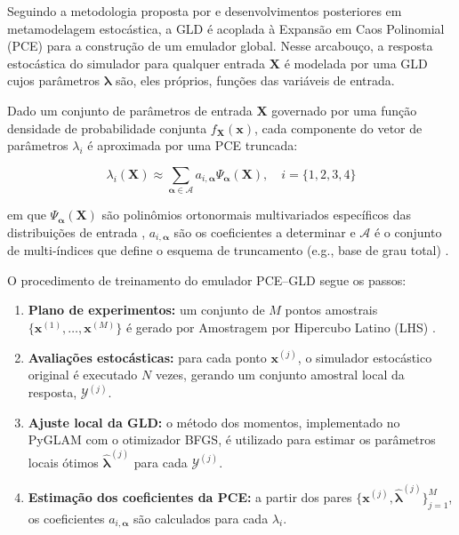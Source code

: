 Seguindo a metodologia proposta por \citet{ZhuSudret2021} e desenvolvimentos posteriores em metamodelagem estocástica, a GLD é acoplada à Expansão em Caos Polinomial (PCE) para a construção de um emulador global. Nesse arcabouço, a resposta estocástica do simulador para qualquer entrada $\mathbf{X}$ é modelada por uma GLD cujos parâmetros $\boldsymbol{\lambda}$ são, eles próprios, funções das variáveis de entrada.

Dado um conjunto de parâmetros de entrada $\mathbf{X}$ governado por uma função densidade de probabilidade conjunta $f_{\mathbf{X}}(\mathbf{x})$, cada componente do vetor de parâmetros $\lambda_i$ é aproximada por uma PCE truncada:

\begin{equation}
\lambda_i(\mathbf{X}) \approx \sum_{\boldsymbol{\alpha} \in \mathcal{A}} a_{i, \boldsymbol{\alpha}} \Psi_{\boldsymbol{\alpha}}(\mathbf{X}), \quad i = \{1, 2, 3, 4\}
\label{eq:pce_lambda}
\end{equation}

\noindent em que $\Psi_{\boldsymbol{\alpha}}(\mathbf{X})$ são polinômios ortonormais multivariados específicos das distribuições de entrada \citep{xiu2002}, $a_{i, \boldsymbol{\alpha}}$ são os coeficientes a determinar e $\mathcal{A}$ é o conjunto de multi-índices que define o esquema de truncamento (e.g., base de grau total) \citep{blatman2011}.

O procedimento de treinamento do emulador PCE--GLD segue os passos:

\begin{enumerate}
    \item \textbf{Plano de experimentos:} um conjunto de $M$ pontos amostrais $\{\mathbf{x}^{(1)}, \dots, \mathbf{x}^{(M)}\}$ é gerado por Amostragem por Hipercubo Latino (LHS) \citep{mckay1979}.
    \item \textbf{Avaliações estocásticas:} para cada ponto $\mathbf{x}^{(j)}$, o simulador estocástico original é executado $N$ vezes, gerando um conjunto amostral local da resposta, $\mathcal{Y}^{(j)}$.
    \item \textbf{Ajuste local da GLD:} o método dos momentos, implementado no PyGLAM com o otimizador BFGS, é utilizado para estimar os parâmetros locais ótimos $\hat{\boldsymbol{\lambda}}^{(j)}$ para cada $\mathcal{Y}^{(j)}$.
    \item \textbf{Estimação dos coeficientes da PCE:} a partir dos pares $\{\mathbf{x}^{(j)}, \hat{\boldsymbol{\lambda}}^{(j)}\}_{j=1}^M$, os coeficientes $a_{i, \boldsymbol{\alpha}}$ são calculados para cada $\lambda_i$.
\end{enumerate}

